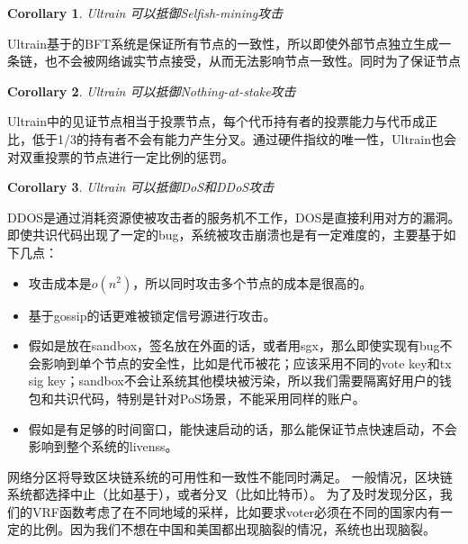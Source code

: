 \documentclass[12pt, UTF8]{article}
\newtheorem{corollary}{Corollary}[theorem]
\begin{document}
\begin{corollary}
Ultrain 可以抵御Selfish-mining攻击
\end{corollary}
Ultrain基于的BFT系统是保证所有节点的一致性，所以即使外部节点独立生成一条链，也不会被网络诚实节点接受，从而无法影响节点一致性。同时为了保证节点

\begin{corollary}
Ultrain 可以抵御Nothing-at-stake攻击
\end{corollary}
Ultrain中的见证节点相当于投票节点，每个代币持有者的投票能力与代币成正比，低于1/3的持有者不会有能力产生分叉。通过硬件指纹的唯一性，Ultrain也会对双重投票的节点进行一定比例的惩罚。

\begin{corollary}
Ultrain 可以抵御DoS和DDoS攻击
\end{corollary}
DDOS是通过消耗资源使被攻击者的服务机不工作，DOS是直接利用对方的漏洞。
即使共识代码出现了一定的bug，系统被攻击崩溃也是有一定难度的，主要基于如下几点：
\begin{itemize}
\item 攻击成本是$o(n^2)$，所以同时攻击多个节点的成本是很高的。
\item 基于gossip的话更难被锁定信号源进行攻击。
\item 假如是放在sandbox，签名放在外面的话，或者用sgx，那么即使实现有bug不会影响到单个节点的安全性，比如是代币被花；应该采用不同的vote key和tx sig key；sandbox不会让系统其他模块被污染，所以我们需要隔离好用户的钱包和共识代码，特别是针对PoS场景，不能采用同样的账户。
\item 假如是有足够的时间窗口，能快速启动的话，那么能保证节点快速启动，不会影响到整个系统的livenss。
\end{itemize}

网络分区将导致区块链系统的可用性和一致性不能同时满足。
一般情况，区块链系统都选择中止（比如基于），或者分叉（比如比特币）。
为了及时发现分区，我们的VRF函数考虑了在不同地域的采样，比如要求voter必须在不同的国家内有一定的比例。因为我们不想在中国和美国都出现脑裂的情况，系统也出现脑裂。

\medskip


\end{document}
